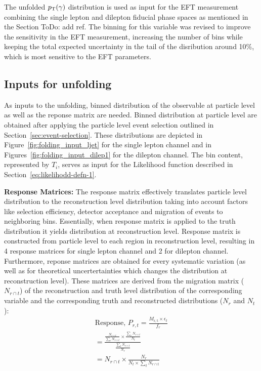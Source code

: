 The unfolded $p_{\text{T}}(\gamma)$ distribution is used as input for the EFT measurement combining the single lepton and dilepton fiducial phase spaces as mentioned in the Section {ToDo: add ref}. The binning for this variable was revised to improve the sensitivity in the EFT measurement, increasing the number of bins while keeping the total expected uncertainty in the tail of the disribution around 10\%, which is most sensitive to the EFT parameters.  



\subsection{Inputs for unfolding}
\label{sec:inputs-for-unfolding}
As inputs to the unfolding, binned distribution of the observable at particle level as well as the reponse matrix are needed. Binned distribution at particle level are obtained after applying the particle level event selection outlined in Section~\ref{sec:event-selection}. These distributions are depicted in Figure~\ref{fig:folding_input_ljet} for the single lepton channel and in Figures~\ref{fig:folding_input_dilep1} for the dilepton channel. The bin content, represented by $T_{i}$, serves as input for the Likelihood function described in Section~\ref{eq:likelihodd-defn-1}.

\textbf{Response Matrices:}
The response matrix effectively translates particle level distribution to the reconstruction level distribution taking into account factors like selection efficiency, detector acceptance and migration of events to neighboring bins. Essentially, when response matrix is applied to the truth distribution it yields distribution at reconstruction level. Response matrix is constructed from particle level to each region in reconstruction level, resulting in 4 response matrices for single lepton channel and 2 for dilepton channel. Furthermore, reponse matrices are obtained for every systematic variation (as well as for theoretical uncertertainties which changes the distribution at reconstruction level). These matrices are derived from the migration matrix ($N_{r \cap t}$) of the reconstruction and truth level distribution of the corresponding variable and the corresponding truth and reconstructed distributions ($N_{r}$ and $N_{t}$):
\begin{align}
    \text{Response, } P_{r,t} = \frac{M_{\mathrm{r,t}} \times \epsilon_{t}}{f_{r}}\\
    = \frac{\frac{N_{r \cap t}}{\sum_{r} N_{r \cap t}} \times \frac{\sum_{r} N_{r \cap t}}{N_{t}}}{\frac{\sum_{t} N_{r \cap t}}{N_{r}}}\\
    = N_{r \cap t} \times \frac{N_{r}}{N_{t}\times \sum_{t} N_{r \cap t}}
\end{align}

